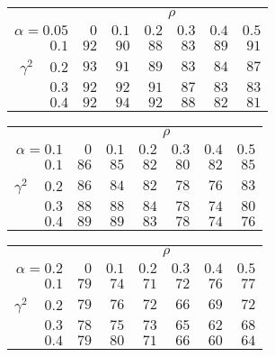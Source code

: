 \begin{tabular}{r|rrrrrr}
\hline\hline
 &\multicolumn{6}{c}{$\rho$} \\ 
 $\alpha = 0.05$ & $0$ & $0.1$ & $0.2$ & $0.3$ & $0.4$ & $0.5$ \\ 
 \hline$0.1$ & $92$ & $90$ & $88$ & $83$ & $89$ & $91$\\ 
$\gamma^2\;\;\;$ $0.2$ & $93$ & $91$ & $89$ & $83$ & $84$ & $87$\\ 
$0.3$ & $92$ & $92$ & $91$ & $87$ & $83$ & $83$\\ 
$0.4$ & $92$ & $94$ & $92$ & $88$ & $82$ & $81$\\ 
 \hline 
 \end{tabular}
 
 \vspace{2em} 
 
\begin{tabular}{r|rrrrrr}
\hline\hline
 &\multicolumn{6}{c}{$\rho$} \\ 
 $\alpha = 0.1$ & $0$ & $0.1$ & $0.2$ & $0.3$ & $0.4$ & $0.5$ \\ 
 \hline$0.1$ & $86$ & $85$ & $82$ & $80$ & $82$ & $85$\\ 
$\gamma^2\;\;\;$ $0.2$ & $86$ & $84$ & $82$ & $78$ & $76$ & $83$\\ 
$0.3$ & $88$ & $88$ & $84$ & $78$ & $74$ & $80$\\ 
$0.4$ & $89$ & $89$ & $83$ & $78$ & $74$ & $76$\\ 
 \hline 
 \end{tabular}
 
 \vspace{2em} 
 
\begin{tabular}{r|rrrrrr}
\hline\hline
 &\multicolumn{6}{c}{$\rho$} \\ 
 $\alpha = 0.2$ & $0$ & $0.1$ & $0.2$ & $0.3$ & $0.4$ & $0.5$ \\ 
 \hline$0.1$ & $79$ & $74$ & $71$ & $72$ & $76$ & $77$\\ 
$\gamma^2\;\;\;$ $0.2$ & $79$ & $76$ & $72$ & $66$ & $69$ & $72$\\ 
$0.3$ & $78$ & $75$ & $73$ & $65$ & $62$ & $68$\\ 
$0.4$ & $79$ & $80$ & $71$ & $66$ & $60$ & $64$\\ 
 \hline 
 \end{tabular}